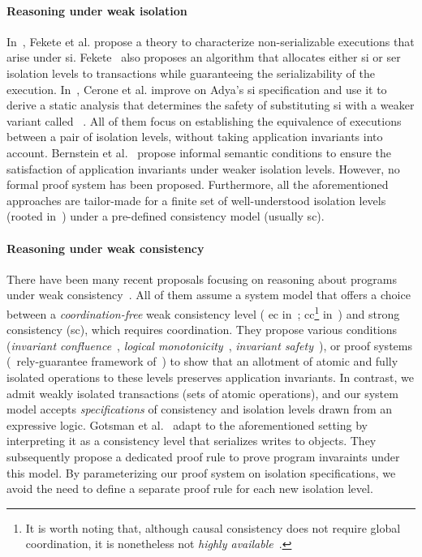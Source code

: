 \paragraph{Reasoning under weak isolation} In~\cite{feketessi}, Fekete
et al. propose a theory to characterize non-serializable executions
that arise under {\sc si}. Fekete~\cite{fekete2005} also proposes an
algorithm that allocates either {\sc si} or {\sc ser} isolation levels
to transactions while guaranteeing the serializability of the
execution. In~\cite{gotsmanpodc16}, Cerone et al. improve on Adya's
{\sc si} specification and use it to derive a static analysis that
determines the safety of substituting {\sc si} with a weaker variant
called ~\cite{psi}. All of them focus
on establishing the equivalence of executions between a pair of
isolation levels, without taking application invariants into account.
Bernstein et al.~\cite{bern2000} propose informal semantic conditions
to ensure the satisfaction of application invariants under weaker
isolation levels.  However, no formal proof system has been proposed.
Furthermore, all the aforementioned approaches are tailor-made for a
finite set of well-understood isolation levels (rooted
in~\cite{berenson}) under a pre-defined consistency model (usually
{\sc sc}). 

\paragraph{Reasoning under weak consistency} There have been many
recent proposals focusing on reasoning about programs under weak
consistency~\cite{bailisvldb, alvarocalm, gotsmanpopl16,redblueatc,
redblueosdi, ecinec}. All of them assume a system model that offers a
choice between a \emph{coordination-free} weak consistency level ({\sc
ec} in~\cite{redblueosdi, redblueatc, ecinec, alvarocalm, bailisvldb};
{\sc cc}\footnote{It is worth noting that, although causal consistency
does not require global coordination, it is nonetheless not
\emph{highly available}~\cite{bailishat}.} in~\cite{gotsmanpopl16})
and strong consistency ({\sc sc}), which requires coordination.  They
propose various conditions (\eg \emph{invariant
confluence}~\cite{bailisvldb}, \emph{logical
monotonicity}~\cite{alvarocalm}, \emph{invariant
safety}~\cite{redblueatc}), or proof systems (\eg~rely-guarantee
framework of~\cite{gotsmanpopl16}) to show that an allotment of atomic
and fully isolated operations to these levels preserves application
invariants.  In contrast, we admit weakly isolated transactions (sets
of atomic operations), and our system model accepts
\emph{specifications} of consistency and isolation levels drawn from
an expressive logic. Gotsman et al.~\cite{gotsmanpopl16} adapt
 to the aforementioned setting by
interpreting it as a consistency level that serializes writes to
objects. They subsequently propose a dedicated proof rule to prove
program invaraints under this model. By parameterizing our proof
system on isolation specifications, we avoid the need to define a
separate proof rule for each new isolation level. 

